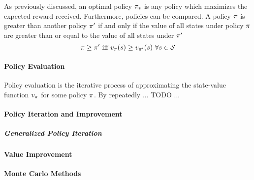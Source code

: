 As previously discussed,
an optimal policy $\pi_*$ is any policy which maximizes the expected reward
received.
%
Furthermore, policies can be compared.
%
A policy $\pi$ is greater than another policy $\pi'$
if and only if the value of all states under policy $\pi$
are greater than or equal to the value of all states under $\pi'$
\[
\policy \ge \policy'\ 
	\text{iff}\ 
	v_\policy(s) \ge v_{\policy'}(s)\ \forall s\in\States
\]


\paragraph*{Policy Evaluation}


Policy evaluation is the iterative process of approximating the state-value
function $v_\pi$ for some policy $\pi$.
%
By repeatedly ... TODO ...



\paragraph*{Policy Iteration and Improvement}



% 

	\subparagraph*{Generalized Policy Iteration}


\paragraph*{Value Improvement}


\paragraph*{Monte Carlo Methods}

